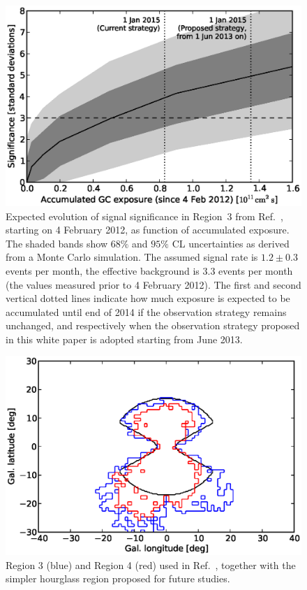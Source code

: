 \documentclass[aps,prd,superscriptaddress,showpacs,nofootinbib,fixlfloat, 12pt]{revtex4-1}
\begin{document}
\begin{figure}[h]
  \begin{center}
    \includegraphics[width=0.6\linewidth]{plots/projection.eps}
    \vspace{-0.5cm}
  \end{center}
  \caption{
    Expected evolution of signal significance in Region~3 from
    Ref.~\cite{Weniger:2012}, starting on 4
    February 2012, as function of
    accumulated exposure.  The shaded bands show $68\%$ and $95\%$ CL
    uncertainties as derived from a Monte Carlo simulation.  The assumed
    signal rate is $1.2\pm 0.3$ events per month, the effective background is
    $3.3$ events per month (the values measured prior to 4 February 2012).
    The first and second vertical dotted lines indicate how much exposure is
    expected to be accumulated until end of 2014 if the observation strategy remains
    unchanged, and respectively when the observation strategy proposed in this
    white paper is adopted starting from June 2013.}
  \label{fig:projection}
\end{figure}

\begin{figure}[h]
  \begin{center}
    \includegraphics[width=0.6\linewidth]{plots/regions.eps}
    \vspace{-0.5cm}
  \end{center}
  \caption{Region 3 (blue) and Region 4 (red) used in
    Ref.~\cite{Weniger:2012}, together with the simpler hourglass region
    proposed for future studies.}
  \label{fig:projection}
\end{figure}
\end{document}
